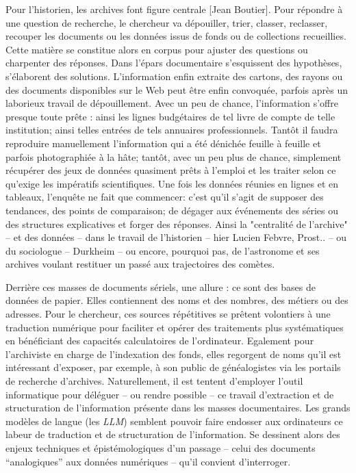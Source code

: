Pour l'historien, les archives font figure centrale [Jean Boutier]. Pour répondre à une question de recherche, le chercheur va dépouiller, trier, classer, reclasser, recouper les documents ou les données issus de fonds ou de collections recueillies. Cette matière se constitue alors en corpus pour ajuster des questions ou charpenter des réponses. Dans l'épars documentaire s'esquissent des hypothèses, s'élaborent des solutions. L'information enfin extraite des cartons, des rayons ou des documents disponibles sur le Web peut être enfin convoquée, parfois après un laborieux travail de dépouillement. Avec un peu de chance, l'information s'offre presque toute prête : ainsi les lignes budgétaires de tel livre de compte de telle institution; ainsi telles entrées de tels annuaires professionnels. Tantôt il faudra reproduire manuellement l'information qui a été dénichée feuille à feuille et parfois photographiée à la hâte; tantôt, avec un peu plus de chance, simplement récupérer des jeux de données quasiment prêts à l'emploi et les traiter selon ce qu'exige les impératifs scientifiques. Une fois les données réunies en lignes et en tableaux, l'enquête ne fait que commencer: c'est qu'il s'agit de supposer des tendances, des points de comparaison; de dégager aux événements des séries ou des structures explicatives et forger des réponses. Ainsi la "centralité de l'archive" -- et des données -- dans le travail de l'historien -- hier Lucien Febvre, Prost.. -- ou du sociologue -- Durkheim -- ou encore, pourquoi pas, de l'astronome et ses archives voulant restituer un passé aux trajectoires des comètes. 

Derrière ces masses de documents sériels, une allure : ce sont des bases de données de papier. Elles contiennent des noms et des nombres, des métiers ou des adresses. Pour le chercheur, ces sources répétitives se prêtent volontiers à une traduction numérique pour faciliter et opérer des traitements plus systématiques en bénéficiant des capacités calculatoires de l'ordinateur. Egalement pour l'archiviste en charge de l'indexation des fonds, elles regorgent de noms qu'il est intéressant d'exposer, par exemple, à son public de généalogistes via les portails de recherche d'archives. Naturellement, il est tentent d'employer l'outil informatique pour déléguer -- ou rendre possible -- ce travail d'extraction et de structuration de l'information présente dans les masses documentaires. Les grands modèles de langue (les \textit{LLM}) semblent pouvoir faire endosser aux ordinateurs ce labeur de traduction et de structuration de l'information. Se dessinent alors des enjeux techniques et épistémologiques d'un passage -- celui des documents \enquote{analogiques} aux données numériques -- qu'il convient d'interroger. 

